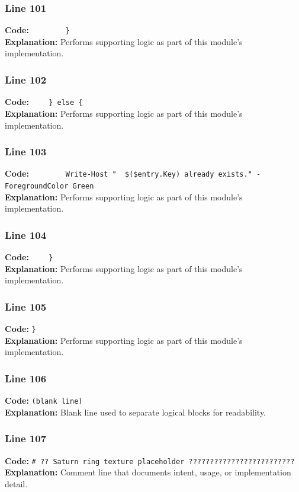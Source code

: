 \documentclass[11pt,a4paper]{article}
\begin{document}
\subsubsection*{Line 101}
\textbf{Code:} \verb|        }|\\
\textbf{Explanation:} Performs supporting logic as part of this module's implementation.

\subsubsection*{Line 102}
\textbf{Code:} \verb|    } else {|\\
\textbf{Explanation:} Performs supporting logic as part of this module's implementation.

\subsubsection*{Line 103}
\textbf{Code:} \verb|        Write-Host "  $($entry.Key) already exists." -ForegroundColor Green|\\
\textbf{Explanation:} Performs supporting logic as part of this module's implementation.

\subsubsection*{Line 104}
\textbf{Code:} \verb|    }|\\
\textbf{Explanation:} Performs supporting logic as part of this module's implementation.

\subsubsection*{Line 105}
\textbf{Code:} \verb|}|\\
\textbf{Explanation:} Performs supporting logic as part of this module's implementation.

\subsubsection*{Line 106}
\textbf{Code:} \texttt{(blank line)}\\
\textbf{Explanation:} Blank line used to separate logical blocks for readability.

\subsubsection*{Line 107}
\textbf{Code:} \verb|# ?? Saturn ring texture placeholder ?????????????????????????|\\
\textbf{Explanation:} Comment line that documents intent, usage, or implementation detail.
\end{document}
